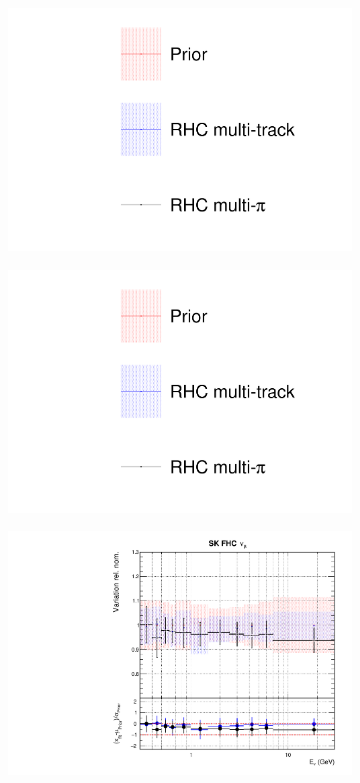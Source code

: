 \begin{figure}[t]
\centering
\begin{subfigure}{0.3\textwidth}
  \centering
  \includegraphics[width=1.0\linewidth, trim={5mm  130mm 0mm 10mm}, clip]{figs/rhcmpdat248_leg}	
\end{subfigure}
\begin{subfigure}{0.3\textwidth}
  \centering
  \includegraphics[width=1.0\linewidth, trim={5mm  0mm 0mm 70mm}, clip]{figs/rhcmpdat248_leg}	
\end{subfigure}
\begin{subfigure}{0.42\textwidth}
  \centering
  \includegraphics[width=0.75\linewidth]{figs/rhcmpasmvflux8}

\end{subfigure}
\end{figure}
